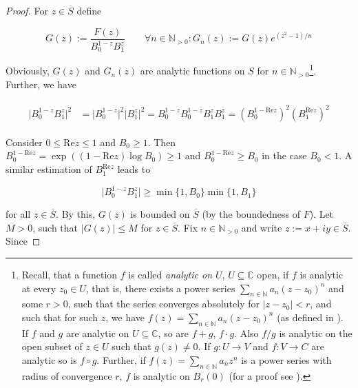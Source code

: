 \begin{proof}
	For $z \in \overline{S}$ define 

\begin{equation}
	G(z) := \frac{F(z)}{B_0^{1 - z}B_1^z} \qquad \forall n \in \mathbb{N}_{>0}: G_n(z) := G(z) e^{(z^2 - 1)/n} 
\end{equation}

Obviously, $G(z)$ and $G_n(z)$ are analytic functions on $S$ for $n \in \mathbb{N}_{>0}$\footnote{
						Recall, that a function $f$ is called \emph{analytic on $U$}, $U \subseteq \mathbb{C}$ open, if $f$ is analytic at every $z_0 \in U$, that is, there exists a power series $\sum_{n \in \mathbb{N}} a_n (z - z_0)^n$ and some $r > 0$, such that the series converges absolutely for $\vert z - z_0 \vert < r$, and such that for such $z$, we have $f(z) = \sum_{n \in \mathbb{N}} a_n (z - z_0)^n$ (as defined in \cite[68--69]{lang:complex_analysis:1993}). If $f$ and $g$ are analytic on $U \subseteq \mathbb{C}$, so are $f + g$, $f \cdot g$. Also $f/g$ is analytic on the open subset of $z \in U$ such that $g(z) \neq 0$. If $g:U \rightarrow V$ and $f: V \rightarrow C$ are analytic so is $f \circ g$. Further, if $f(z) = \sum_{n \in \mathbb{N}}a_n z^n$ is a power series with radius of convergence $r$, $f$ is analytic on $B_r(0)$ (for a proof see \cite[69--70]{lang:complex_analysis:1993}).	
					}. Further, we have

					\begin{gather}
						\begin{aligned}
							\vert B_0^{1 - z}B_1^z \vert^2 &= \vert B_0^{1 - z}\vert^2 \vert B_1^z \vert^2 = B_0^{1 - z}B_0^{1 - \overline{z}} B_1^z B_1^{\overline{z}} = \left( B_0^{1 -\mathrm{Re}z} \right)^2 \left( B_1^{\mathrm{Re}z} \right)^2 
						\end{aligned}
					\end{gather}

					Consider $0 \leqslant \mathrm{Re} z \leqslant 1$ and $B_0 \geqslant 1$. Then  $B_0^{1 - \mathrm{Re}z} = \exp\left((1 - \mathrm{Re}z ) \log B_0\right) \geqslant 1$ and $B_0^{1 - \mathrm{Re} z } \geqslant B_0$ in the case $B_0 < 1$. A similar estimation of $B_1^{\mathrm{Re}z}$ leads to 

					\begin{equation}
						\vert B_0^{1 - z}B_1^z \vert \geqslant \min\{1,B_0\}\min\{1,B_1\}
					\end{equation}

					for all $z \in \overline{S}$. By this, $G(z)$ is bounded on $\overline{S}$ (by the boundedness of $F$). Let $M > 0$, such that $\vert G(z) \vert \leqslant M$ for $z \in \overline{S}$. Fix $n \in \mathbb{N}_{>0}$ and write $z := x + iy \in \overline{S}$. Since


\end{proof}
